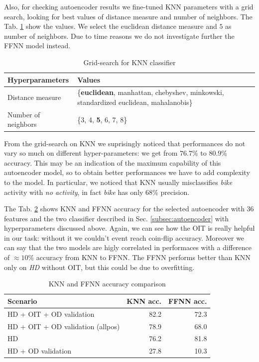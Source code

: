 Also, for checking autoencoder results we fine-tuned KNN parameters
with a grid search, looking for best values of distance measure and
number of neighbors. The Tab. \ref{tab:knn-grid-search} show the values.
We select the euclidean distance measure and $5$ as number of neighbors.
Due to time reasons we do not investigate further the FFNN model instead.
\begin{table}[H]
  \centering
  \begin{tabular}{p{2cm}p{4.5cm}}
    \hline
    Hyperparameters & Values \\
    \hline
    Distance measure & \{\textbf{euclidean}, manhattan, chebyshev, minkowski, standardized euclidean, mahalanobis\} \\
    Number of neighbors & \{3, 4, \textbf{5}, 6, 7, 8\} \\
    \hline
  \end{tabular}
  \caption{Grid-search for KNN classifier}
  \label{tab:knn-grid-search}
\end{table}

From the grid-search on KNN we suprisingly noticed that performances
do not vary so much on different hyper-parameters: we get from
$76.7$\% to $80.9$\% accuracy. This may be an indication of the
maximum capability of this autoencoder model, so to obtain better
performances we have to add complexity to the model. In particular, we
noticed that KNN usually misclassifies \textit{bike} activity with
\textit{no activity}, in fact \textit{bike} has only
$68$\% precision.

The Tab. \ref{tab:ae-classifiers-accuracy} shows KNN and FFNN accuracy
for the selected autoencoder with $36$ features and the two classifier
described in Sec. \ref{subsec:autoencoder} with hyperparameters
discussed above. Again, we can see how the OIT is really helpful in
our task: without it we couldn't event reach coin-flip
accuracy. Moreover we can say that the two models are higly correlated
in performaces with a difference of $\approx 10$\% accuracy from KNN
to FFNN. The FFNN performs better than KNN only on \textit{HD} without
OIT, but this could be due to overfitting.

\begin{table}[H]
  \centering
  \begin{tabular}{p{4cm}rr}
    \hline
    Scenario & KNN acc. & FFNN acc. \\
    \hline
    HD + OIT + OD validation & 82.2  & 72.3 \\
    HD + OIT + OD validation (allpos) &  78.9 & 68.0 \\
    HD & 76.2 & 81.8 \\
    HD + OD validation & 27.8 & 10.3 \\
    \hline
  \end{tabular}
  \caption{KNN and FFNN accuracy comparison}
  \label{tab:ae-classifiers-accuracy}
\end{table}

